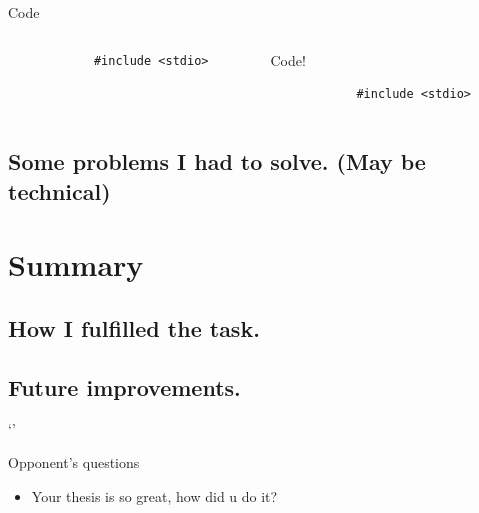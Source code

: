 \documentclass[aspectratio=169]{beamer}
\begin{document}
\begin{frame}[fragile]{Code}
\begin{columns}
    \begin{column}{20em}
        \begin{lstlisting}
            #include <stdio>
        \end{lstlisting}
    \end{column}
        \pause
    \begin{column}{20em}        
    \begin{exampleblock}{Code!}
        \begin{lstlisting}
            #include <stdio>
        \end{lstlisting}
    \end{exampleblock}
    \end{column}
\end{columns}
\end{frame}

\subsection{Some problems I had to solve. (May be technical)}



\section{Summary}

\subsection{How I fulfilled the task.}
\subsection{Future improvements.}`'

\begin{frame}{Opponent's questions}
    \begin{itemize}
        \item Your thesis is so great, how did u do it?
    \end{itemize}
\end{frame}


\end{document}
